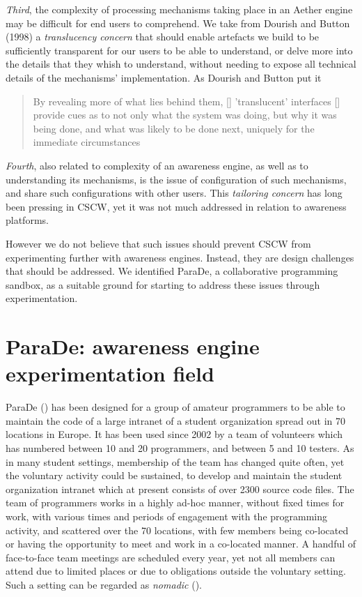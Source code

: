 \documentclass{ecscw2007}
\begin{document}
\textit{Third}, the complexity of processing mechanisms taking place in an Aether engine may be difficult for end users to comprehend. We take from Dourish and Button (1998) a \textit{translucency concern} that should enable artefacts we build to be sufficiently transparent for our users to be able to understand, or delve more into the details that they whish to understand, without needing to expose all technical details of the mechanisms' implementation. As Dourish and Button put it
\begin{quote}By revealing more of what lies behind them, [] 'translucent' interfaces [] provide cues as to not only what the system was doing, but why it was being done, and what was likely to be done next, uniquely for the immediate circumstances
\end{quote}

\textit{Fourth}, also related to complexity of an awareness engine, as well as to understanding its mechanisms, is the issue of configuration of such mechanisms, and share such configurations with other users. This \textit{tailoring concern} has long been pressing in CSCW, yet it was not much addressed in relation to awareness platforms.

However we do not believe that such issues should prevent CSCW from experimenting further with awareness engines. Instead, they are design challenges that should be addressed. We identified ParaDe, a collaborative programming sandbox, as a suitable ground for starting to address these issues through experimentation. 

\section*{ParaDe: awareness engine experimentation field} 
ParaDe (\cite{bogdan-coop08}) has been designed for a group of amateur programmers to be able to maintain the code of a large intranet of a student organization spread out in 70 locations in Europe. It has been used since 2002 by a team of volunteers which has numbered between 10 and 20 programmers, and between 5 and 10 testers. As in many student settings, membership of the team has changed quite often, yet the voluntary activity could be sustained, to develop and maintain the student organization intranet which at present consists of over 2300 source code files. The team of programmers works in a highly ad-hoc manner, without fixed times for work, with various times and  periods of engagement with the programming activity, and scattered over the 70 locations, with few members being co-located or having the opportunity to meet and work in a co-located manner. A handful of face-to-face team meetings are scheduled every year, yet not all members can attend due to limited places or due to obligations outside the voluntary setting. Such a setting can be regarded as \textit{nomadic} (\cite{bogdan-coop06}).
\end{document}

